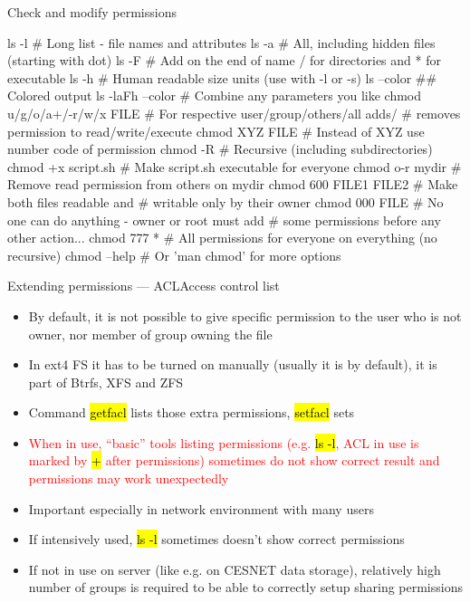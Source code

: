 \documentclass[compress, ucs, xelatex, 11pt, xcolor=svgnames,
  hyperref={
    bookmarks=true,
    unicode=true,
    colorlinks=true,
    pdftitle={Linux, command line and MetaCentrum},
    plainpages=false,
    pdfauthor={Vojtech Zeisek},
    pdfsubject={Course about use of Linux command line, writing shell scripts and using MetaCentrum of CESNET},
    pdfcreator={XeLaTeX},
    pdfkeywords={Linux, GNU, BASH, shell, command line, MetaCentrum},
    linkcolor=DarkRed,
    anchorcolor=DarkBlue,
    citecolor=Indigo,
    filecolor=NavyBlue,
    menucolor=DarkMagenta,
    urlcolor=DarkBlue,
    pdftex},
  url={hyphens, lowtilde} %
  ]{beamer}
\renewcommand{\texttt}[1]{\hl{\ttfamily #1}}
\renewcommand{\alert}[1]{\textcolor{red}{#1}}
\begin{document}
\begin{frame}[fragile]{Check and modify permissions}
  \begin{bashcode}
    ls -l # Long list - file names and attributes
    ls -a # All, including hidden files (starting with dot)
    ls -F # Add on the end of name / for directories and * for executable
    ls -h # Human readable size units (use with -l or -s)
    ls --color ## Colored output
    ls -laFh --color # Combine any parameters you like
    chmod u/g/o/a+/-r/w/x FILE # For respective user/group/others/all adds/
                               # removes permission to read/write/execute
    chmod XYZ FILE # Instead of XYZ use number code of permission
    chmod -R # Recursive (including subdirectories)
    chmod +x script.sh # Make script.sh executable for everyone
    chmod o-r mydir # Remove read permission from others on mydir
    chmod 600 FILE1 FILE2 # Make both files readable and
                          # writable only by their owner
    chmod 000 FILE # No one can do anything - owner or root must add
                   # some permissions before any other action...
    chmod 777 * # All permissions for everyone on everything (no recursive)
    chmod --help # Or 'man chmod' for more options 
  \end{bashcode}
\end{frame}

\begin{frame}{Extending permissions --- ACL}{Access control list}
  \label{acl}
  \begin{itemize}
    \item By default, it is not possible to give specific permission to the user who is not owner, nor member of group owning the file
    \item In ext4 FS it has to be turned on manually (usually it is by default), it is part of Btrfs, XFS and ZFS
    \item Command \texttt{getfacl} lists those extra permissions, \texttt{setfacl} sets
    \item \alert{When in use, ``basic'' tools listing permissions (e.g. \texttt{ls -l}, ACL in use is marked by \texttt{+} after permissions) sometimes do not show correct result and permissions may work unexpectedly}
    \item Important especially in network environment with many users
    \item If intensively used, \texttt{ls -l} sometimes doesn't show correct permissions
    \item If not in use on server (like e.g. on CESNET data storage), relatively high number of groups is required to be able to correctly setup sharing permissions
  \end{itemize}
\end{frame}
\end{document}
